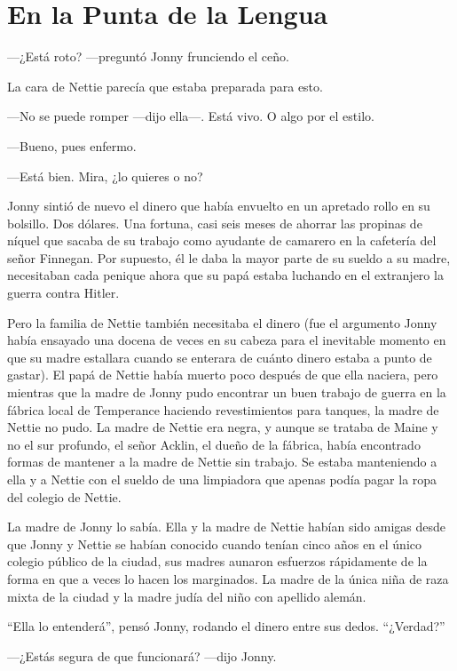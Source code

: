 \part*{En la Punta de la Lengua}

---¿Está roto? ---preguntó Jonny frunciendo el ceño.

La cara de Nettie parecía que estaba preparada para esto.

---No se puede romper ---dijo ella---. Está vivo. O algo por el estilo.

---Bueno, pues enfermo.

---Está bien. Mira, ¿lo quieres o no?

Jonny sintió de nuevo el dinero que había envuelto en un apretado rollo
en su bolsillo. Dos dólares. Una fortuna, casi seis meses de ahorrar las
propinas de níquel que sacaba de su trabajo como ayudante de camarero en
la cafetería del señor Finnegan. Por supuesto, él le daba la mayor parte
de su sueldo a su madre, necesitaban cada penique ahora que su papá
estaba luchando en el extranjero la guerra contra Hitler.

Pero la familia de Nettie también necesitaba el dinero (fue el argumento
Jonny había ensayado una docena de veces en su cabeza para el inevitable
momento en que su madre estallara cuando se enterara de cuánto dinero
estaba a punto de gastar). El papá de Nettie había muerto poco después
de que ella naciera, pero mientras que la madre de Jonny pudo encontrar
un buen trabajo de guerra en la fábrica local de Temperance haciendo
revestimientos para tanques, la madre de Nettie no pudo. La madre de
Nettie era negra, y aunque se trataba de Maine y no el sur profundo, el
señor Acklin, el dueño de la fábrica, había encontrado formas de
mantener a la madre de Nettie sin trabajo. Se estaba manteniendo a ella
y a Nettie con el sueldo de una limpiadora que apenas podía pagar la
ropa del colegio de Nettie.

La madre de Jonny lo sabía. Ella y la madre de Nettie habían sido amigas
desde que Jonny y Nettie se habían conocido cuando tenían cinco años en
el único colegio público de la ciudad, sus madres aunaron esfuerzos
rápidamente de la forma en que a veces lo hacen los marginados. La madre
de la única niña de raza mixta de la ciudad y la madre judía del niño
con apellido alemán.

``Ella lo entenderá'', pensó Jonny, rodando el dinero entre sus dedos.
``¿Verdad?''

---¿Estás segura de que funcionará? ---dijo Jonny.

